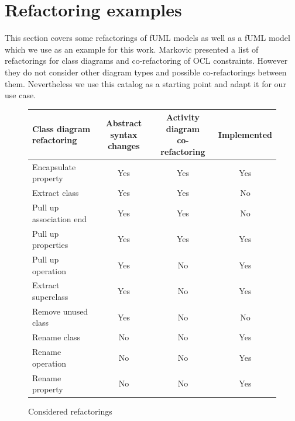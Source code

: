 \documentclass{llncs}
\begin{document}


\section{Refactoring examples}
\label{refactoring-examples}

This section covers some refactorings of fUML models as well as a fUML model which we use as an example for this work. 
Markovic \cite{DBLP:journals/sosym/MarkovicB08} presented a list of refactorings for class 
diagrams and co-refactoring of OCL constraints. However they do not consider other diagram types and possible co-refactorings between 
them. Nevertheless we use this catalog as a starting point and adapt it for our use case. 

\begin{figure}[h!t]
 \centering
 \begin{tabular}[]{l | c | c | c}
  \shortstack{Class diagram\\refactoring} & \shortstack{Abstract syntax\\changes} & \shortstack{Activity diagram\\co-refactoring} & Implemented\\
  \hline
  Encapsulate property & Yes & Yes & Yes\\
  Extract class & Yes & Yes & No\\
  Pull up association end & Yes & Yes & No\\
  Pull up properties & Yes & Yes & Yes\\
  Pull up operation & Yes & No & Yes\\
  Extract superclass & Yes & No & Yes\\
  Remove unused class & Yes & No & No\\
  Rename class & No & No & Yes\\
  Rename operation & No & No & Yes\\
  Rename property & No & No & Yes\\
 \end{tabular}
 \caption{Considered refactorings}
 \label{fig:refactoringlist}
\end{figure}
\end{document}
